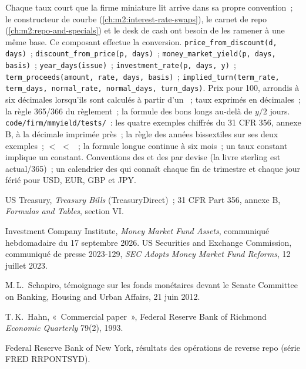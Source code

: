 \begin{build}
 Chaque taux court que la firme miniature lit arrive dans sa
propre convention~; le constructeur de courbe (\cref{ch:m2:interest-rate-swaps}), le carnet de repo
(\cref{ch:m2:repo-and-specials}) et le desk de cash ont besoin de les ramener
à une même base. Ce composant effectue la conversion.
 \texttt{price\_from\_discount(d, days)}~;
\texttt{discount\_from\_price(p, days)}~;
\texttt{money\_market\_yield(p, days, basis)}~; \texttt{year\_days(issue)}~;
\texttt{investment\_rate(p, days, y)}~; \texttt{term\_proceeds(amount, rate,
days, basis)}~; \texttt{implied\_turn(term\_rate, term\_days, normal\_rate,
normal\_days, turn\_days)}.  Prix pour 100, arrondis à six décimales lorsqu'ils sont calculés
à partir d'un ~; taux exprimés en décimales~; la règle 365/366 du règlement~; la
formule des bons longs au-delà de $y/2$ jours.
 \texttt{code/firm/mmyield/tests/}~: les quatre exemples chiffrés
du 31 CFR 356, annexe B, à la décimale imprimée près~; la règle des années
bissextiles sur ses deux exemples~;  $<$  $<$ ~; la
formule longue continue à six mois~; un taux constant implique un  constant.
 Conventions des  et des  par devise (la livre sterling
est actual/365)~; un calendrier des  qui connaît chaque fin de trimestre et chaque jour férié pour
USD, EUR, GBP et JPY.
\end{build}

\begin{omsources}
\item US Treasury, \emph{Treasury Bills} (TreasuryDirect)~; 31 CFR Part 356,
annexe B, \emph{Formulas and Tables}, section VI.
\item Investment Company Institute, \emph{Money Market Fund Assets}, communiqué hebdomadaire
du 17 septembre 2026. US Securities and Exchange Commission, communiqué
de presse 2023-129, \emph{SEC Adopts Money Market Fund Reforms}, 12 juillet 2023.
\item M.\,L.\ Schapiro, témoignage sur les fonds monétaires devant le
Senate Committee on Banking, Housing and Urban Affairs, 21 juin 2012.
\item T.\,K.\ Hahn, «~Commercial paper~», Federal Reserve Bank of Richmond
\emph{Economic Quarterly} 79(2), 1993.
\item Federal Reserve Bank of New York, résultats des opérations de reverse repo
(série FRED RRPONTSYD).
\end{omsources}


